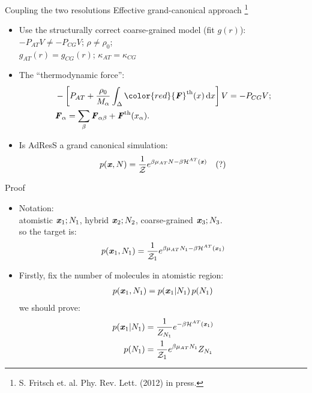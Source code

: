 \documentclass{beamer}
\newcommand{\redc}[1]{{\color{red} #1}}
\newcommand{\bluec}[1]{{\color{blue} #1}}
\renewcommand{\v}[1]{\textbf{\textit{#1}}}
\begin{document}
\begin{frame}{Coupling the two resolutions}
  {Effective grand-canonical approach
    \footnote{S. Fritsch et. al. Phy. Rev. Lett. (2012) in press.}
  }
  \begin{itemize}
    \vfill
  \item <1-> Use the structurally correct coarse-grained model (fit $g(r)$): 
    \bluec{$-P_{AT}V\neq -P_{CG}V$}; \bluec{$\rho\neq \rho_{0}$}; \\
    \redc{$g_{AT}(r) =  g_{CG}(r)$}; \redc{$\kappa_{AT} =  \kappa_{CG}$}
    \vfill
  \item <2-> The ``thermodynamic force'':
    \begin{align*}
      &-\left[P_{AT}+ \frac{\rho_{0}}{M_\alpha}\int_{\Delta} \redc{{\v F}^\text{th}(x)}\,\text{d}x\right] V = -P_{CG}V; \\
      &{\v F}_{\alpha}=\sum_{\beta}{\v F}_{\alpha\beta}+{\v F}^{\textrm{th}}(x_{\alpha}).
    \end{align*}
    \vfill
  \item <3-> Is AdResS a \redc{grand canonical} simulation:
    \begin{align*}
      p(\v x, N) = \frac{1}{\mathcal Z}
      e^{\beta\mu_{AT} N - \beta \mathcal H^{AT}(\v x)} \quad (?)
    \end{align*}
    \vfill
  \end{itemize}
\end{frame}


\begin{frame}{Proof}
  \begin{itemize}
  \item <1-> Notation:\\
    atomistic $\v x_1; N_1$,
    hybrid $\v x_2; N_2$,
    coarse-grained $\v x_3; N_3$.\\
    so the target is:
    \begin{align*}
      p(\v x_1, N_1) = \frac{1}{\mathcal Z_1}
      e^{\beta\mu_{AT} N_1 - \beta \mathcal H^{AT}(\v x_1)} 
    \end{align*}
  \item <2-> Firstly, fix the number of molecules in atomistic region:
    \begin{align*}
      p(\v x_1, N_1) = p(\v x_1 | N_1) \,{p (N_1)}
    \end{align*}
    we should prove:
    \begin{align*}
      p(\v x_1 | N_1) &= \frac{1}{Z_{N_1}} e^{-\beta \mathcal H^{AT}(\v x_1)} \\
      p(N_1) &= \frac{1}{\mathcal Z_1}e^{\beta\mu_{AT} N_1}Z_{N_1}
    \end{align*}
  \end{itemize}
\end{frame}
\end{document}
